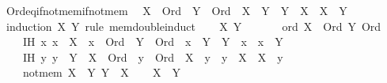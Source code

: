 \begin{isabellebody}
\endisatagproof
{\isafoldproof}%
%
\isadelimproof
\isanewline
%
\endisadelimproof
\isanewline
\isanewline
{}\isamarkupfalse%
\ Ord{\isacharunderscore}{\kern0pt}eq{\isacharunderscore}{\kern0pt}if{\isacharunderscore}{\kern0pt}not{\isacharunderscore}{\kern0pt}mem{\isacharunderscore}{\kern0pt}if{\isacharunderscore}{\kern0pt}not{\isacharunderscore}{\kern0pt}mem{\isacharcolon}{\kern0pt}\isanewline
\ \ {\isachardoublequoteopen}X\ {\isacharcolon}{\kern0pt}\ Ord\ {\isasymLongrightarrow}\ Y\ {\isacharcolon}{\kern0pt}\ Ord\ {\isasymLongrightarrow}\ X\ {\isasymnotin}\ Y\ {\isasymLongrightarrow}\ Y\ {\isasymnotin}\ X\ {\isasymLongrightarrow}\ X\ {\isacharequal}{\kern0pt}\ Y{\isachardoublequoteclose}\isanewline
%
\isadelimproof
%
\endisadelimproof
%
\isatagproof
{}\isamarkupfalse%
\ {\isacharparenleft}{\kern0pt}induction\ X\ Y\ rule{\isacharcolon}{\kern0pt}\ mem{\isacharunderscore}{\kern0pt}double{\isacharunderscore}{\kern0pt}induct{\isacharparenright}{\kern0pt}\isanewline
\ \ \isamarkupfalse%
\ X\ Y\isanewline
\ \ \isamarkupfalse%
\isanewline
\ \ \ \ ord{\isacharcolon}{\kern0pt}\ {\isachardoublequoteopen}X\ {\isacharcolon}{\kern0pt}\ Ord{\isachardoublequoteclose}\ {\isachardoublequoteopen}Y{\isacharcolon}{\kern0pt}\ Ord{\isachardoublequoteclose}\ \isanewline
\ \ \ \ IH{}{\isacharcolon}{\kern0pt}\ {\isachardoublequoteopen}{\isasymAnd}x{\isachardot}{\kern0pt}\ x\ {\isasymin}\ X\ {\isasymLongrightarrow}\ x\ {\isacharcolon}{\kern0pt}\ Ord\ {\isasymLongrightarrow}\ Y\ {\isacharcolon}{\kern0pt}\ Ord\ {\isasymLongrightarrow}\ x\ {\isasymnotin}\ Y\ {\isasymLongrightarrow}\ Y\ {\isasymnotin}\ x\ {\isasymLongrightarrow}\ x\ {\isacharequal}{\kern0pt}\ Y{\isachardoublequoteclose}\ \isanewline
\ \ \ \ IH{}{\isacharcolon}{\kern0pt}\ {\isachardoublequoteopen}{\isasymAnd}y{\isachardot}{\kern0pt}\ y\ {\isasymin}\ Y\ {\isasymLongrightarrow}\ X\ {\isacharcolon}{\kern0pt}\ Ord\ {\isasymLongrightarrow}\ y\ {\isacharcolon}{\kern0pt}\ Ord\ {\isasymLongrightarrow}\ X\ {\isasymnotin}\ y\ {\isasymLongrightarrow}\ y\ {\isasymnotin}\ X\ {\isasymLongrightarrow}\ X\ {\isacharequal}{\kern0pt}\ y{\isachardoublequoteclose}\ \isanewline
\ \ \ \ not{\isacharunderscore}{\kern0pt}mem{\isacharcolon}{\kern0pt}\ {\isachardoublequoteopen}X\ {\isasymnotin}\ Y{\isachardoublequoteclose}\ {\isachardoublequoteopen}Y\ {\isasymnotin}\ X{\isachardoublequoteclose}\isanewline
\ \ \isamarkupfalse%
\ {\isachardoublequoteopen}X\ {\isacharequal}{\kern0pt}\ Y{\isachardoublequoteclose}\isanewline

\end{isabellebody}
